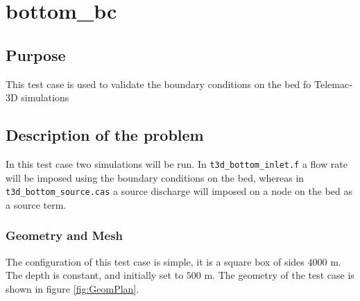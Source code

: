 \chapter{bottom\_bc}%
%

%
\section{Purpose}
%
This test case is used to validate the boundary conditions on the bed fo
Telemac-3D simulations
%
\section{Description of the problem}
%
In this test case two simulations will be run. In \texttt{t3d\_bottom\_inlet.f}
a flow rate will be imposed using the boundary conditions on the bed, whereas
in \texttt{t3d\_bottom\_source.cas} a source discharge will imposed on a node
on the bed as a source term.


%

%
%
\subsection{Geometry and Mesh}
%
The configuration of this test case is simple, it is a square box of sides
$4000$ m. The depth is constant, and initially set to $500$ m. The geometry of
the test case is shown in figure \ref{fig:GeomPlan}.

